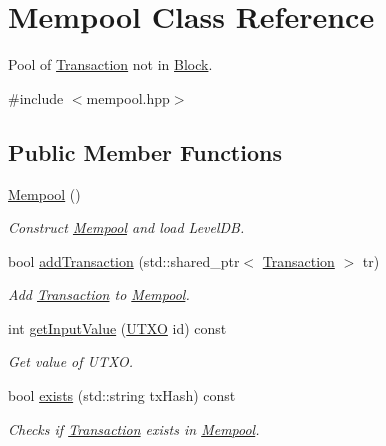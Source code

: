 \hypertarget{classMempool}{}\section{Mempool Class Reference}
\label{classMempool}


Pool of \mbox{\hyperlink{classTransaction}{Transaction}} not in \mbox{\hyperlink{classBlock}{Block}}.  




{\ttfamily \#include $<$mempool.\+hpp$>$}

\subsection*{Public Member Functions}
\begin{DoxyCompactItemize}
\item 
\mbox{\hyperlink{classMempool_a7d26cf499215b7660b991b03f20937dd}{Mempool}} ()
\begin{DoxyCompactList}\small\item\em Construct \mbox{\hyperlink{classMempool}{Mempool}} and load Level\+DB. \end{DoxyCompactList}\item 
bool \mbox{\hyperlink{classMempool_a7f1fff7b367c389ed3c8b847dde46add}{add\+Transaction}} (std\+::shared\+\_\+ptr$<$ \mbox{\hyperlink{classTransaction}{Transaction}} $>$ tr)
\begin{DoxyCompactList}\small\item\em Add \mbox{\hyperlink{classTransaction}{Transaction}} to \mbox{\hyperlink{classMempool}{Mempool}}. \end{DoxyCompactList}\item 
int \mbox{\hyperlink{classMempool_ab2b01cf87f14318e182b56462c0bf4f6}{get\+Input\+Value}} (\mbox{\hyperlink{utxo_8hpp_a19091d002da03ec92277e19295ac4540}{U\+T\+XO}} id) const
\begin{DoxyCompactList}\small\item\em Get value of U\+T\+XO. \end{DoxyCompactList}\item 
bool \mbox{\hyperlink{classMempool_a3a11892f1519132f81204e57cc758666}{exists}} (std\+::string tx\+Hash) const
\begin{DoxyCompactList}\small\item\em Checks if \mbox{\hyperlink{classTransaction}{Transaction}} exists in \mbox{\hyperlink{classMempool}{Mempool}}. \end{DoxyCompactList}\item 

\end{DoxyCompactItemize}
